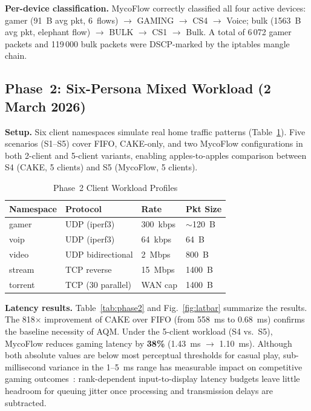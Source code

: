 \documentclass[conference]{IEEEtran}
\begin{document}
\textbf{Per-device classification.}
MycoFlow correctly classified all four active devices:
gamer (91~B avg pkt, 6~flows) $\to$ GAMING $\to$ CS4 $\to$ Voice;
bulk (1563~B avg pkt, elephant flow) $\to$ BULK $\to$ CS1 $\to$ Bulk.
A total of 6\,072 gamer packets and 119\,000 bulk packets were DSCP-marked
by the iptables mangle chain.

\subsection{Phase~2: Six-Persona Mixed Workload (2 March 2026)}

\textbf{Setup.}
Six client namespaces simulate real home traffic patterns (Table~\ref{tab:workload}).
Five scenarios (S1--S5) cover FIFO, CAKE-only, and two MycoFlow configurations
in both 2-client and 5-client variants, enabling apples-to-apples comparison
between S4 (CAKE, 5 clients) and S5 (MycoFlow, 5 clients).

\begin{table}[t]
\caption{Phase~2 Client Workload Profiles}
\label{tab:workload}
\centering
\small
\begin{tabular}{llll}
\toprule
\textbf{Namespace} & \textbf{Protocol} & \textbf{Rate} & \textbf{Pkt Size} \\
\midrule
gamer   & UDP (iperf3)        & 300~kbps   & $\sim$120~B \\
voip    & UDP (iperf3)        & 64~kbps    & 64~B \\
video   & UDP bidirectional   & 2~Mbps     & 800~B \\
stream  & TCP reverse         & 15~Mbps    & 1400~B \\
torrent & TCP (30 parallel)   & WAN cap    & 1400~B \\
\bottomrule
\end{tabular}
\end{table}

\textbf{Latency results.}
Table~\ref{tab:phase2} and Fig.~\ref{fig:latbar} summarize the results.
The 818$\times$ improvement of CAKE over FIFO (from 558~ms to 0.68~ms) confirms
the baseline necessity of AQM.
Under the 5-client workload (S4 vs.\ S5), MycoFlow reduces gaming latency
by \textbf{38\%} (1.43~ms $\to$ 1.10~ms).
Although both absolute values are below most perceptual thresholds for casual
play, sub-millisecond variance in the 1--5~ms range has measurable impact on
competitive gaming outcomes~\cite{claypool2006}: rank-dependent input-to-display
latency budgets leave little headroom for queuing jitter once processing and
transmission delays are subtracted.
\end{document}
